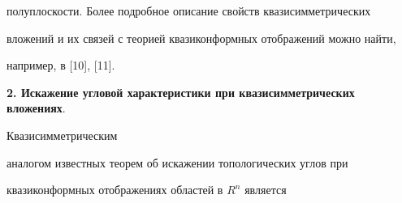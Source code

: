 полуплоскости. Более подробное описание свойств квазисимметрических 


вложений и их связей с теорией квазиконформных отображений можно найти, 


например, в [10], [11].


\medskip





\addtocounter{section}{1}


\setcounter{equation}{0}


\setcounter{thms}{0}





{\bf 2. Искажение угловой характеристики при квазисимметрических вложениях}. 


Квазисимметрическим


аналогом известных теорем об искажении топологических углов при 


квазиконформных отображениях областей в $R^n$ является 





